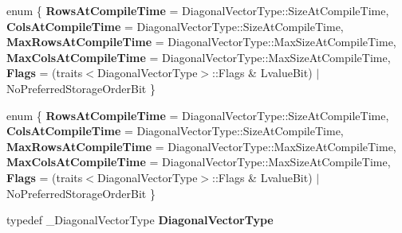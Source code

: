 \begin{DoxyCompactItemize}
\item 
\mbox{\label{struct_eigen_1_1internal_1_1traits_3_01_diagonal_wrapper_3_01___diagonal_vector_type_01_4_01_4_a862254520fcad2ccdfaf87b56822e364}} 
enum \{ \newline
{\bfseries Rows\+At\+Compile\+Time} = Diagonal\+Vector\+Type\+:\+:Size\+At\+Compile\+Time, 
{\bfseries Cols\+At\+Compile\+Time} = Diagonal\+Vector\+Type\+:\+:Size\+At\+Compile\+Time, 
{\bfseries Max\+Rows\+At\+Compile\+Time} = Diagonal\+Vector\+Type\+:\+:Max\+Size\+At\+Compile\+Time, 
{\bfseries Max\+Cols\+At\+Compile\+Time} = Diagonal\+Vector\+Type\+:\+:Max\+Size\+At\+Compile\+Time, 
\newline
{\bfseries Flags} = (traits$<$Diagonal\+Vector\+Type$>$\+:\+:Flags \& Lvalue\+Bit) $\vert$ No\+Preferred\+Storage\+Order\+Bit
 \}
\item 
\mbox{\label{struct_eigen_1_1internal_1_1traits_3_01_diagonal_wrapper_3_01___diagonal_vector_type_01_4_01_4_a9e5e5d97db0190eb4d108407a533deeb}} 
enum \{ \newline
{\bfseries Rows\+At\+Compile\+Time} = Diagonal\+Vector\+Type\+:\+:Size\+At\+Compile\+Time, 
{\bfseries Cols\+At\+Compile\+Time} = Diagonal\+Vector\+Type\+:\+:Size\+At\+Compile\+Time, 
{\bfseries Max\+Rows\+At\+Compile\+Time} = Diagonal\+Vector\+Type\+:\+:Max\+Size\+At\+Compile\+Time, 
{\bfseries Max\+Cols\+At\+Compile\+Time} = Diagonal\+Vector\+Type\+:\+:Max\+Size\+At\+Compile\+Time, 
\newline
{\bfseries Flags} = (traits$<$Diagonal\+Vector\+Type$>$\+:\+:Flags \& Lvalue\+Bit) $\vert$ No\+Preferred\+Storage\+Order\+Bit
 \}
\item 
\mbox{\label{struct_eigen_1_1internal_1_1traits_3_01_diagonal_wrapper_3_01___diagonal_vector_type_01_4_01_4_a89ad48a2edbce9615060580cd8a8dc7e}} 
typedef \+\_\+\+Diagonal\+Vector\+Type {\bfseries Diagonal\+Vector\+Type}
\item 
\mbox{\label{struct_eigen_1_1internal_1_1traits_3_01_diagonal_wrapper_3_01___diagonal_vector_type_01_4_01_4_a7ac8c5f89e88d54b8a5dd3595e572095}} 

\end{DoxyCompactItemize}
